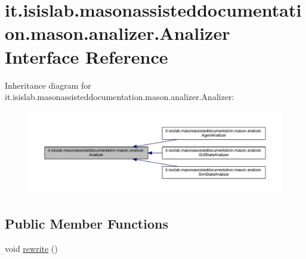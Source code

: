 \hypertarget{interfaceit_1_1isislab_1_1masonassisteddocumentation_1_1mason_1_1analizer_1_1_analizer}{\section{it.\-isislab.\-masonassisteddocumentation.\-mason.\-analizer.\-Analizer Interface Reference}
\label{interfaceit_1_1isislab_1_1masonassisteddocumentation_1_1mason_1_1analizer_1_1_analizer}
}


Inheritance diagram for it.\-isislab.\-masonassisteddocumentation.\-mason.\-analizer.\-Analizer\-:\nopagebreak
\begin{figure}[H]
\begin{center}
\leavevmode
\includegraphics[width=350pt]{interfaceit_1_1isislab_1_1masonassisteddocumentation_1_1mason_1_1analizer_1_1_analizer__inherit__graph}
\end{center}
\end{figure}
\subsection*{Public Member Functions}
\begin{DoxyCompactItemize}
\item 
void \hyperlink{interfaceit_1_1isislab_1_1masonassisteddocumentation_1_1mason_1_1analizer_1_1_analizer_a6b8cb1fad306066e18f05427fa306360}{rewrite} ()
\end{DoxyCompactItemize}


